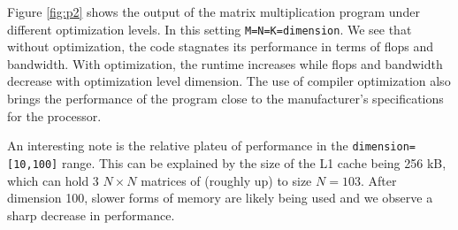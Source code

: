\documentclass[12pt,reqno]{amsart}
\begin{document}
\begin{problem}
Figure \ref{fig:p2} shows the
output of the matrix multiplication program under different optimization levels.
In this setting \texttt{M=N=K=dimension}.
We see that without optimization, the code stagnates its performance in terms of
flops and bandwidth. With optimization, the runtime increases while flops and bandwidth decrease with
optimization level dimension. The use of compiler optimization also brings the
performance of the program close to the manufacturer's specifications for the
processor. 

An interesting note is the relative plateu
of performance in the \texttt{dimension=[10,100]} range. This can be explained 
by the size of the L1 cache being 256 kB, which can hold 3 $N \times N$ matrices
of (roughly up) to size $N=103$. After dimension 100, slower forms of memory are
likely being used and we observe a sharp decrease in performance.

\end{problem}


%   

\vspace{1em}
\end{document}
